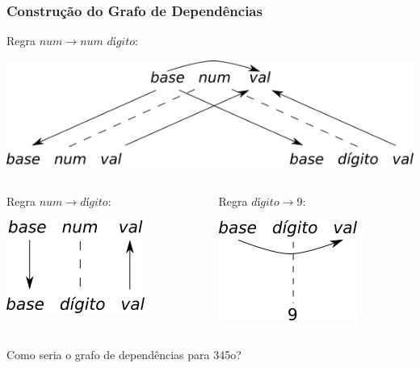 \documentclass[table]{beamer}
\begin{document}
\begin{frame}
   \frametitle{Construção do Grafo de Dependências}
   Regra $num \to num \textit{ dígito}$: \\
   \begin{center}
   \includegraphics[scale=0.4]{figuras/exemplo68a.png}
   \end{center}
   \begin{columns}
   \begin{column}{0.5\textwidth}
   Regra $num \to \textit{dígito}$: \\
   \begin{center}
   \includegraphics[scale=0.6]{figuras/exemplo68b.png}
   \end{center}
   \end{column}
   \begin{column}{0.5\textwidth}
   Regra $\textit{dígito} \to 9$: \\
   \begin{center}
   \includegraphics[scale=0.6]{figuras/exemplo68c.png}
   \end{center}
   \end{column}
   \end{columns}
   \begin{center}
   Como seria o grafo de dependências para 345o?
   \end{center}
\end{frame}
\end{document}
